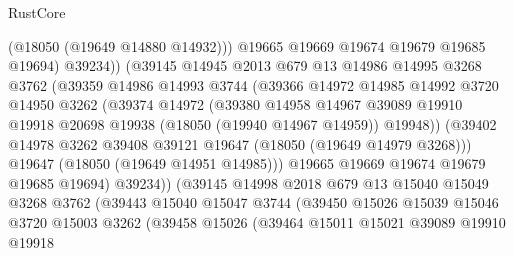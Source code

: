 \begin{lexlean}{RustCore}
\begin{coremodule}
                            (@18050 (@19649 @14880 @14932)))
                          @19665
                          @19669
                          @19674
                          @19679
                          @19685
                          @19694)
                        @39234))
                    (@39145
                      @14945
                      @2013
                      @679
                      @13
                      @14986
                      @14995
                      @3268
                      @3762
                      (@39359
                        @14986
                        @14993
                        @3744
                        (@39366
                          @14972
                          @14985
                          @14992
                          @3720
                          @14950
                          @3262
                          (@39374
                            @14972
                            (@39380
                              @14958
                              @14967
                              @39089
                              @19910
                              @19918
                              @20698
                              @19938
                              (@18050 (@19940 @14967 @14959))
                              @19948))
                          (@39402 @14978 @3262 @39408 @39121 @19647 (@18050 (@19649 @14979 @3268)))
                          @19647
                          (@18050 (@19649 @14951 @14985)))
                        @19665
                        @19669
                        @19674
                        @19679
                        @19685
                        @19694)
                      @39234))
                  (@39145
                    @14998
                    @2018
                    @679
                    @13
                    @15040
                    @15049
                    @3268
                    @3762
                    (@39443
                      @15040
                      @15047
                      @3744
                      (@39450
                        @15026
                        @15039
                        @15046
                        @3720
                        @15003
                        @3262
                        (@39458
                          @15026
                          (@39464
                            @15011
                            @15021
                            @39089
                            @19910
                            @19918

\end{coremodule}
\end{lexlean}
